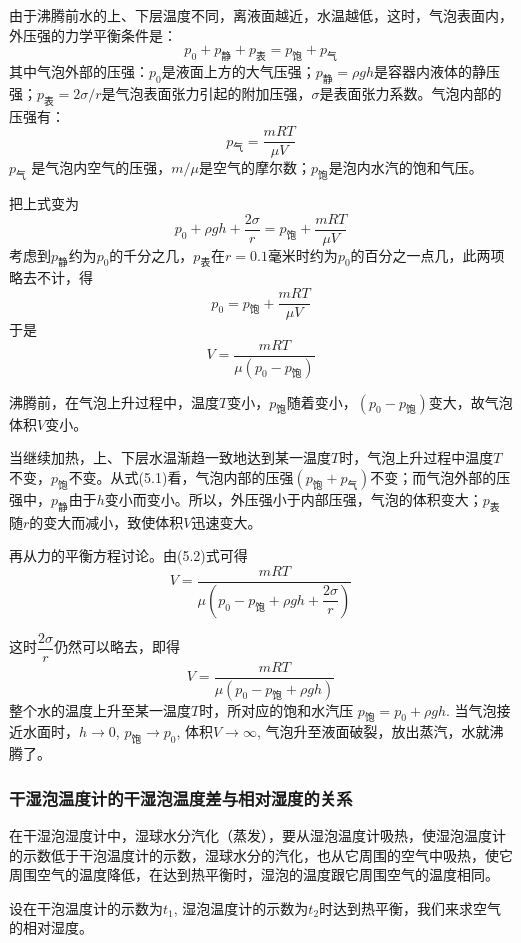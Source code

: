 由于沸腾前水的上、下层温度不同，离液面越近，水温越低，这时，气泡表面内，外压强的力学平衡条件是：
\begin{equation}
  p_0+p_{\text{静}}+p_{\text{表}}=p_{\text{饱}}+p_{\text{气}}
\end{equation}
其中气泡外部的压强：$p_0$是液面上方的大气压强；$p_{\text{静}}=\rho gh$是容器内液体的静压强；$p_{\text{表}}=2\sigma/r$是气泡表面张力引起的附加压强，$\sigma$是表面张力系数。气泡内部的压强有：
\[p_{\text{气}}=\frac{mRT}{\mu V}\]
$p_{\text{气}}$
是气泡内空气的压强，$m/\mu$是空气的摩尔数；$p_{\text{饱}}$是泡内水汽的饱和气压。

把上式变为
\begin{equation}
  p_0+\rho gh+\frac{2\sigma}{r}=p_{\text{饱}}+\frac{mRT}{\mu V}
\end{equation}
考虑到$p_{\text{静}}$约为$p_0$的千分之几，$p_{\text{表}}$在$r=0. 1$毫米时约为$p_0$的百分之一点几，此两项略去不计，得
\[p_0=p_{\text{饱}}+\frac{mRT}{\mu V}\]
于是
\[V=\frac{mRT}{\mu (p_0-p_{\text{饱}})}\]

沸腾前，在气泡上升过程中，温度$T$变小，$p_{\text{饱}}$随着变小，$(p_0-p_{\text{饱}})$变大，故气泡体积$V$变小。

当继续加热，上、下层水温渐趋一致地达到某一温度$T$时，气泡上升过程中温度$T$不变，$p_{\text{饱}}$不变。从式(5.1)看，气泡内部的压强$(p_{\text{饱}}+p_{\text{气}})$不变；而气泡外部的压强中，$p_{\text{静}}$由于$h$变小而变小。所以，外压强小于内部压强，气泡的体积变大；$p_{\text{表}}$随$r$的变大而减小，致使体积$V$迅速变大。

再从力的平衡方程讨论。由(5.2)式可得
\[V=\frac{mRT}{\mu(p_0-p_{\text{饱}}+\rho gh+\dfrac{2\sigma}{r})}\]

这时$\dfrac{2\sigma}{r}$仍然可以略去，即得
\[V=\frac{mRT}{\mu(p_0-p_{\text{饱}}+\rho gh)}\]
整个水的温度上升至某一温度$T$时，所对应的饱和水汽压
$p_{\text{饱}}=p_0+\rho gh$. 当气泡接近水面时，$h\to 0$, $p_{\text{饱}}\to p_0$, 体积$V\to \infty$, 气泡升至液面破裂，放出蒸汽，水就沸腾了。

\subsubsection{干湿泡温度计的干湿泡温度差与相对湿度的关系}

在干湿泡湿度计中，湿球水分汽化（蒸发），要从湿泡温度计吸热，使湿泡温度计的示数低于干泡温度计的示数，湿球水分的汽化，也从它周围的空气中吸热，使它周围空气的温度降低，在达到热平衡时，湿泡的温度跟它周围空气的温度相同。

设在干泡温度计的示数为$t_1$, 湿泡温度计的示数为$t_2$时达到热平衡，我们来求空气的相对湿度。

